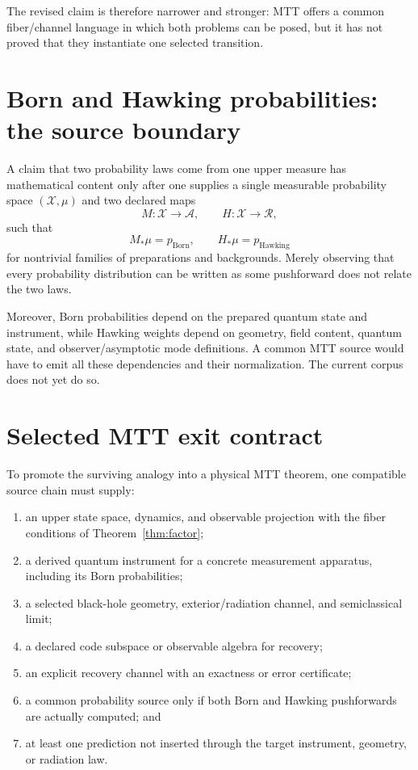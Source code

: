 \documentclass[11pt]{article}
\newcommand{\X}{\mathcal X}
\begin{document}
The revised claim is therefore narrower and stronger: MTT offers a common
fiber/channel language in which both problems can be posed, but it has not
proved that they instantiate one selected transition.

\section{Born and Hawking probabilities: the source boundary}

A claim that two probability laws come from one upper measure has mathematical
content only after one supplies a single measurable probability space
$(\X,\mu)$ and two declared maps
\[
 M:\X\to\mathcal A,
 \qquad
 H:\X\to\mathcal R,
\]
such that
\[
 M_*\mu=p_{\mathrm{Born}},
 \qquad
 H_*\mu=p_{\mathrm{Hawking}}
\]
for nontrivial families of preparations and backgrounds. Merely observing
that every probability distribution can be written as some pushforward does
not relate the two laws.

Moreover, Born probabilities depend on the prepared quantum state and
instrument, while Hawking weights depend on geometry, field content, quantum
state, and observer/asymptotic mode definitions. A common MTT source would
have to emit all these dependencies and their normalization. The current
corpus does not yet do so.

\section{Selected MTT exit contract}

To promote the surviving analogy into a physical MTT theorem, one compatible
source chain must supply:
\begin{enumerate}
\item an upper state space, dynamics, and observable projection with the fiber
conditions of Theorem~\ref{thm:factor};
\item a derived quantum instrument for a concrete measurement apparatus,
including its Born probabilities;
\item a selected black-hole geometry, exterior/radiation channel, and
semiclassical limit;
\item a declared code subspace or observable algebra for recovery;
\item an explicit recovery channel with an exactness or error certificate;
\item a common probability source only if both Born and Hawking pushforwards
are actually computed; and
\item at least one prediction not inserted through the target instrument,
geometry, or radiation law.
\end{enumerate}
\end{document}
